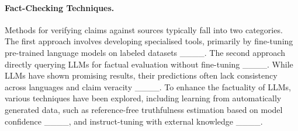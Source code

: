 \begin{table*}[ht!]
\small
\centering
{}
\caption{A comparison of multilingual or synthetic datasets for fact-checking.}
  \label{table:datasets_comparison}
\end{table*}


\paragraph{Fact-Checking Techniques.}
Methods for verifying claims against sources typically fall into two categories. The first approach involves developing specialised tools, primarily by fine-tuning pre-trained language models on labeled datasets ____. The second approach directly querying LLMs for factual evaluation without fine-tuning ____. 
While LLMs have shown promising results, their predictions often lack consistency across languages and claim veracity ____. 
To enhance the factuality of LLMs, various techniques have been explored, including learning from automatically generated data, such as reference-free truthfulness estimation based on model confidence ____, and instruct-tuning with external knowledge ____.